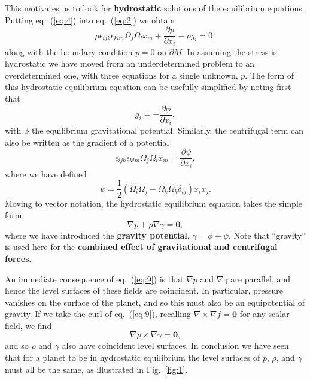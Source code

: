 This motivates us to look for \textbf{hydrostatic} solutions of the equilibrium equations. Putting eq.~(\ref{eq:4}) into eq.~(\ref{eq:2}) we obtain
\begin{equation}
\rho\epsilon_{ijk}\epsilon_{klm}\Omega_{j}\Omega_{l}x_{m}+\frac{\partial p}{\partial x_{i}}-\rho g_{i}=0,
\label{eq:5}
\end{equation}
along with the boundary condition $p=0$ on $\partial M$. In assuming the stress is hydrostatic 
we have moved from an underdetermined problem to an overdetermined one, with three equations for a single unknown, $p$. 
The form of this hydrostatic equilibrium equation can be usefully simplified by noting first that
\begin{equation}
g_{i}=-\frac{\partial\phi}{\partial x_{i}},
\label{eq:6}
\end{equation}
with $\phi$ the equilibrium gravitational potential. Similarly, the centrifugal term can also be
 written as the gradient of a potential
\begin{equation}
\epsilon_{ijk}\epsilon_{klm}\Omega_{j}\Omega_{l}x_{m}=\frac{\partial\psi}{\partial x_{i}},
\label{eq:7}
\end{equation}
where we have defined
\begin{equation}
\psi=\frac{1}{2}(\Omega_{i}\Omega_{j}-\Omega_{k}\Omega_{k}\delta_{ij})x_{i}x_{j}.
\label{eq:8}
\end{equation}
Moving to vector notation, the hydrostatic equilibrium equation takes the simple form
\begin{equation}
\nabla p+\rho\nabla\gamma=\mathbf{0},
\label{eq:9}
\end{equation}
where we have introduced the \textbf{gravity potential}, $\gamma=\phi+\psi$. Note that ``gravity'' is used
 here for the \textbf{combined effect of gravitational and centrifugal forces}.

An immediate consequence of eq.~(\ref{eq:9}) is that $\nabla p$ and $\nabla\gamma$ are parallel, and hence the level surfaces of these fields are coincident. In particular, pressure vanishes on the surface of the planet, and so this must also be an equipotential of gravity. If we take the curl of eq.~(\ref{eq:9}), recalling $\nabla\times\nabla f=\mathbf{0}$ for any scalar field, we find
\begin{equation}
\nabla\rho\times\nabla\gamma=\mathbf{0},
\label{eq:10}
\end{equation}
and so $\rho$ and $\gamma$ also have coincident level surfaces. In conclusion we have seen 
that for a planet to be in hydrostatic equilibrium the level surfaces of $p$, $\rho$, and $\gamma$ must all be the same, 
as illustrated in Fig.~\ref{fig:1}.

